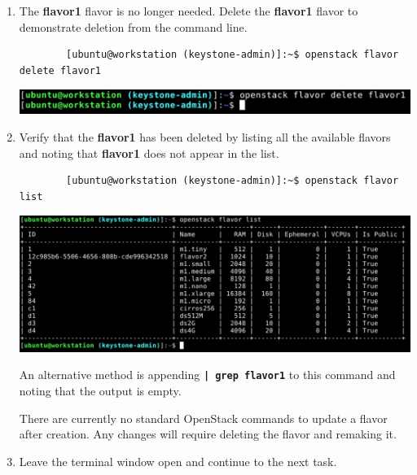 \documentclass[letterpaper, 12pt]{article}
\begin{document}
\begin{enumerate}
    \item The \textbf{flavor1} flavor is no longer needed. Delete the \textbf{flavor1} flavor to demonstrate deletion
    from the command line.
    \begin{lstlisting}
        [ubuntu@workstation (keystone-admin)]:~$ openstack flavor delete flavor1
    \end{lstlisting}

    \begin{center}
        \includegraphics[width=\linewidth]{images/part2/step11.png}
    \end{center}

    \item Verify that the \textbf{flavor1} has been deleted by listing all the available flavors and noting that
    \textbf{flavor1} does not appear in the list.
    \begin{lstlisting}
        [ubuntu@workstation (keystone-admin)]:~$ openstack flavor list    
    \end{lstlisting}

    \begin{center}
        \includegraphics[width=\linewidth]{images/part2/step12.png}
    \end{center}

    \begin{tipbox}
        An alternative method is appending \textbf{\texttt{| grep flavor1}} to this command and noting that the output
        is empty.
    \end{tipbox}

    \begin{notebox}
        There are currently no standard OpenStack commands to update a flavor after creation. Any changes will require
        deleting the flavor and remaking it.
    \end{notebox}

    \item Leave the terminal window open and continue to the next task.
\end{enumerate}
\end{document}
